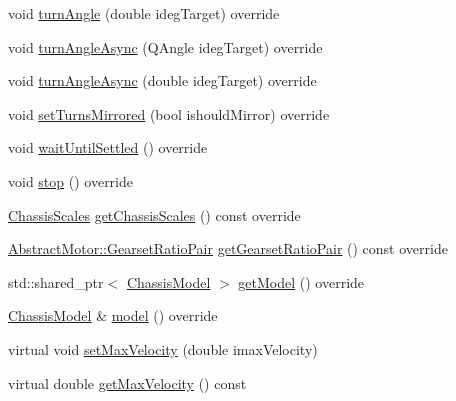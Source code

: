 \begin{DoxyCompactItemize}
\item 
void \mbox{\hyperlink{classokapi_1_1ChassisControllerIntegrated_a3f13749508bf420468ffdb54f62a9da2}{turn\+Angle}} (double ideg\+Target) override
\item 
void \mbox{\hyperlink{classokapi_1_1ChassisControllerIntegrated_a773a99fe7a1540da856ad6b6008ba24f}{turn\+Angle\+Async}} (Q\+Angle ideg\+Target) override
\item 
void \mbox{\hyperlink{classokapi_1_1ChassisControllerIntegrated_abd638be1352919fb211e9b70c181d940}{turn\+Angle\+Async}} (double ideg\+Target) override
\item 
void \mbox{\hyperlink{classokapi_1_1ChassisControllerIntegrated_a37d538f92439644efa50a226c3cefd6d}{set\+Turns\+Mirrored}} (bool ishould\+Mirror) override
\item 
void \mbox{\hyperlink{classokapi_1_1ChassisControllerIntegrated_a2af994f5ddc68a48d7692fd16ca590c0}{wait\+Until\+Settled}} () override
\item 
void \mbox{\hyperlink{classokapi_1_1ChassisControllerIntegrated_aab2f5d5cfb8ad96bd32be26a5a4e7113}{stop}} () override
\item 
\mbox{\hyperlink{classokapi_1_1ChassisScales}{Chassis\+Scales}} \mbox{\hyperlink{classokapi_1_1ChassisControllerIntegrated_a6bbab5d22753736b0507d5fd4deb3982}{get\+Chassis\+Scales}} () const override
\item 
\mbox{\hyperlink{structokapi_1_1AbstractMotor_1_1GearsetRatioPair}{Abstract\+Motor\+::\+Gearset\+Ratio\+Pair}} \mbox{\hyperlink{classokapi_1_1ChassisControllerIntegrated_a42cab9878235cdb4bea46e69f7ccd75d}{get\+Gearset\+Ratio\+Pair}} () const override
\item 
std\+::shared\+\_\+ptr$<$ \mbox{\hyperlink{classokapi_1_1ChassisModel}{Chassis\+Model}} $>$ \mbox{\hyperlink{classokapi_1_1ChassisControllerIntegrated_a60c9a11616a2a41400c17952c36a5b57}{get\+Model}} () override
\item 
\mbox{\hyperlink{classokapi_1_1ChassisModel}{Chassis\+Model}} \& \mbox{\hyperlink{classokapi_1_1ChassisControllerIntegrated_a726fc6cd37748b860e56ddb586b5555a}{model}} () override
\item 
virtual void \mbox{\hyperlink{classokapi_1_1ChassisControllerIntegrated_aaff13c4d1ec3e98a6e153d3602996141}{set\+Max\+Velocity}} (double imax\+Velocity)
\item 
virtual double \mbox{\hyperlink{classokapi_1_1ChassisControllerIntegrated_a0009684f33e2a008621fd601785f85fb}{get\+Max\+Velocity}} () const
\end{DoxyCompactItemize}
